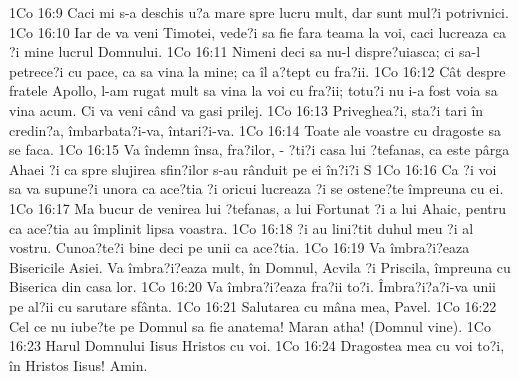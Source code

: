 1Co 16:9  Caci mi s-a deschis u?a mare spre lucru mult, dar sunt mul?i potrivnici.
1Co 16:10  Iar de va veni Timotei, vede?i sa fie fara teama la voi, caci lucreaza ca ?i mine lucrul Domnului.
1Co 16:11  Nimeni deci sa nu-l dispre?uiasca; ci sa-l petrece?i cu pace, ca sa vina la mine; ca îl a?tept cu fra?ii.
1Co 16:12  Cât despre fratele Apollo, l-am rugat mult sa vina la voi cu fra?ii; totu?i nu i-a fost voia sa vina acum. Ci va veni când va gasi prilej.
1Co 16:13  Priveghea?i, sta?i tari în credin?a, îmbarbata?i-va, întari?i-va.
1Co 16:14  Toate ale voastre cu dragoste sa se faca.
1Co 16:15  Va îndemn însa, fra?ilor, - ?ti?i casa lui ?tefanas, ca este pârga Ahaei ?i ca spre slujirea sfin?ilor s-au rânduit pe ei în?i?i S
1Co 16:16  Ca ?i voi sa va supune?i unora ca ace?tia ?i oricui lucreaza ?i se ostene?te împreuna cu ei.
1Co 16:17  Ma bucur de venirea lui ?tefanas, a lui Fortunat ?i a lui Ahaic, pentru ca ace?tia au împlinit lipsa voastra.
1Co 16:18  ?i au lini?tit duhul meu ?i al vostru. Cunoa?te?i bine deci pe unii ca ace?tia.
1Co 16:19  Va îmbra?i?eaza Bisericile Asiei. Va îmbra?i?eaza mult, în Domnul, Acvila ?i Priscila, împreuna cu Biserica din casa lor.
1Co 16:20  Va îmbra?i?eaza fra?ii to?i. Îmbra?i?a?i-va unii pe al?ii cu sarutare sfânta.
1Co 16:21  Salutarea cu mâna mea, Pavel.
1Co 16:22  Cel ce nu iube?te pe Domnul sa fie anatema! Maran atha! (Domnul vine).
1Co 16:23  Harul Domnului Iisus Hristos cu voi.
1Co 16:24  Dragostea mea cu voi to?i, în Hristos Iisus! Amin.


